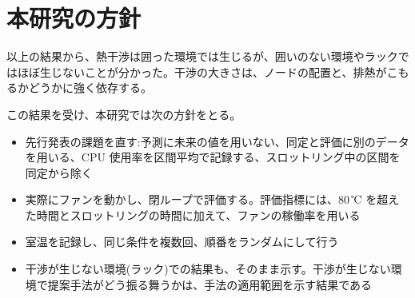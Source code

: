 \section{本研究の方針}\label{sec:pre-policy}
以上の結果から、熱干渉は囲った環境では生じるが、囲いのない環境やラックではほぼ生じないことが分かった。干渉の大きさは、ノードの配置と、排熱がこもるかどうかに強く依存する。

この結果を受け、本研究では次の方針をとる。

\begin{itemize}
  \item 先行発表の課題を直す:予測に未来の値を用いない、同定と評価に別のデータを用いる、CPU 使用率を区間平均で記録する、スロットリング中の区間を同定から除く
  \item 実際にファンを動かし、閉ループで評価する。評価指標には、80\,℃ を超えた時間とスロットリングの時間に加えて、ファンの稼働率を用いる
  \item 室温を記録し、同じ条件を複数回、順番をランダムにして行う
  \item 干渉が生じない環境(ラック)での結果も、そのまま示す。干渉が生じない環境で提案手法がどう振る舞うかは、手法の適用範囲を示す結果である
\end{itemize}

